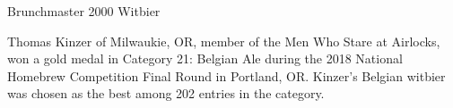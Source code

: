 \stylesection{\stylewitbier}

\begin{recipe}{Brunchmaster 2000 Witbier}

\begin{aboutblock}
Thomas Kinzer of Milwaukie, OR, member of the Men Who Stare at Airlocks, won a
gold medal in Category 21: Belgian Ale during the 2018 National Homebrew
Competition Final Round in Portland, OR. Kinzer's Belgian witbier was chosen as
the best among 202 entries in the category. \sourceaha
\end{aboutblock}


\begin{methodandtiming}
 
\begin{mashsteps}
\end{mashsteps}

\begin{fermentationsteps}
\end{fermentationsteps}

\end{methodandtiming}

\recipebreak

\begin{ingredientsblock}

\begin{malts}
\end{malts}

\begin{hops}
\end{hops}


\end{ingredientsblock}

\end{recipe}

